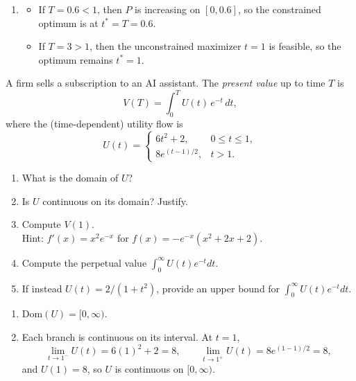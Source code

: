 \documentclass[11pt]{exam}
\begin{document}
\begin{questions}
\begin{solution}[0cm]
\begin{enumerate}[leftmargin = 0.5cm, label = (\alph*), rightmargin = 0.2cm]
\item
\begin{itemize}
\item If $T=0.6<1$, then $P$ is increasing on $[0, 0.6]$, so the constrained optimum is at $t^*=T=0.6$.
\item If $T=3>1$, then the unconstrained maximizer $t=1$ is feasible, so the optimum remains $t^*=1$.
\end{itemize}

\end{enumerate}
\end{solution}

\question[3]
A firm sells a subscription to an AI assistant. The \emph{present value} up to time $T$ is
\[
V(T)=\int_{0}^{T} U(t)\,e^{-t}\,dt,
\]
where the (time-dependent) utility flow is
\[
U(t)=
\begin{cases}
6t^2+2, & 0\le t\le 1,\\[4pt]
8e^{(t - 1)/2}, & t>1.
\end{cases}
\]

\begin{enumerate}[leftmargin = 0.5cm, label = (\alph*), rightmargin = 0.2cm]
    \item What is the domain of $U$?
    \item Is $U$ continuous on its domain? Justify.
    \item Compute $V(1)$. \\
    {\footnotesize Hint: $f'(x) = x^2 e^{-x}$ for $f(x) = -e^{-x}(x^2+2x+2)$.}
    \item Compute the perpetual value $\int_{0}^{\infty} U(t)e^{-t}dt$.
    \item If instead $U(t)=2/(1+t^2)$, provide an upper bound for $\int_{0}^{\infty}U(t)e^{-t}dt$.
\end{enumerate}

\begin{solution}[0cm]
\begin{enumerate}[leftmargin = 0.5cm, label = (\alph*), rightmargin = 0.2cm]

\item
$\mathrm{Dom}(U)=[0,\infty)$.

\item
Each branch is continuous on its interval. At $t=1$,
\[
\lim_{t\to 1^-}U(t)=6(1)^2+2=8,\qquad \lim_{t\to 1^+}U(t)=8e^{(1-1)/2}=8,
\]
and $U(1)=8$, so $U$ is continuous on $[0,\infty)$.


\end{enumerate}
\end{solution}
\end{questions}
\end{document}
